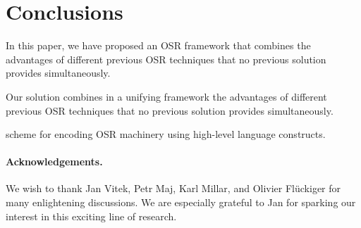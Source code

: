 
\section{Conclusions}
\label{se:conclusions}

In this paper, we have proposed an OSR framework that combines the advantages of different previous OSR techniques that no previous solution provides simultaneously.


Our solution combines in a unifying framework the advantages of different previous OSR techniques that no previous solution provides simultaneously.


scheme for encoding OSR machinery using high-level language constructs. 


\ifx\noauthorea\undefined
\paragraph{Acknowledgements.}

We wish to thank Jan Vitek, Petr Maj, Karl Millar, and Olivier Fl{\"u}ckiger for many enlightening discussions. We are especially grateful to Jan for sparking our interest in this exciting line of research. %
\fi
